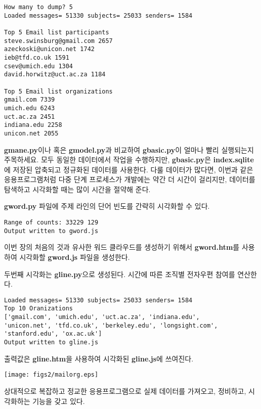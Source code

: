 \beforeverb
\begin{verbatim}
How many to dump? 5
Loaded messages= 51330 subjects= 25033 senders= 1584

Top 5 Email list participants
steve.swinsburg@gmail.com 2657
azeckoski@unicon.net 1742
ieb@tfd.co.uk 1591
csev@umich.edu 1304
david.horwitz@uct.ac.za 1184

Top 5 Email list organizations
gmail.com 7339
umich.edu 6243
uct.ac.za 2451
indiana.edu 2258
unicon.net 2055
\end{verbatim}
\afterverb
%

{\bf gmane.py}이나 혹은 {\bf gmodel.py}과 비교하여 {\bf gbasic.py}이 얼마나 빨리 실행되는지 주목하세요.
모두 동일한 데이터에서 작업을 수행하지만, {\bf gbasic.py}은 {\bf index.sqlite}에 저장된 압축되고 정규화된 데이터를 사용한다. 다룰 데이터가 많다면, 이번과 같은 응용프로그램처럼 다중 단계 프로세스가
개발에는 약간 더 시간이 걸리지만, 데이터를 탐색하고 시각화할 때는 많이 시간을 절약해 준다. 

{\bf gword.py} 파일에 주제 라인의 단어 빈도를 간략히 시각화할 수 있다.

\beforeverb
\begin{verbatim}
Range of counts: 33229 129
Output written to gword.js
\end{verbatim}
\afterverb
%

이번 장의 처음의 것과 유사한 워드 클라우드를 생성하기 위해서 
{\bf gword.htm}를 사용하여 시각화할 {\bf gword.js} 파일을 생성한다.

두번째 시각화는 {\bf gline.py}으로 생성된다. 시간에 따른 조직별 전자우편 참여를 연산한다.

\beforeverb
\begin{verbatim}
Loaded messages= 51330 subjects= 25033 senders= 1584
Top 10 Oranizations
['gmail.com', 'umich.edu', 'uct.ac.za', 'indiana.edu', 
'unicon.net', 'tfd.co.uk', 'berkeley.edu', 'longsight.com', 
'stanford.edu', 'ox.ac.uk']
Output written to gline.js
\end{verbatim}
\afterverb
%

출력값은 {\bf gline.htm}을 사용하여 시각화된 {\bf gline.js}에 쓰여진다.

\beforefig
\centerline{\texttt{[image: figs2/mailorg.eps]}}
\afterfig

상대적으로 복잡하고 정교한 응용프로그램으로 실제 데이터를 가져오고, 정비하고, 시각화하는 기능을 갖고 있다.
